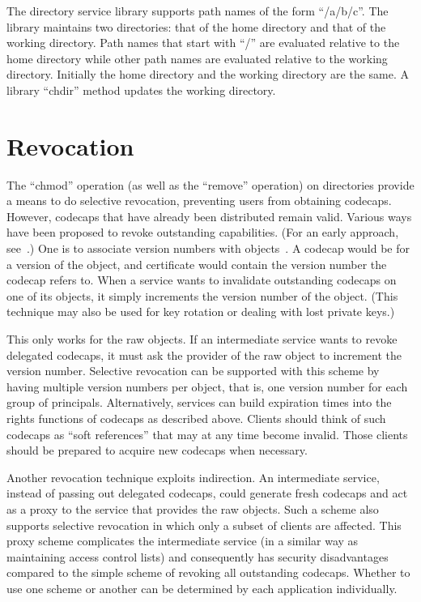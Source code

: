 \documentclass[10pt, conference, compsocconf]{IEEEtran}
\begin{document}
The directory service library supports path names of the form
``/a/b/c''.  The library maintains two directories: that of the
home directory and that of the working directory.  Path names that
start with ``/'' are evaluated relative to the home directory while
other path names are evaluated relative to the working directory.
Initially the home directory and the working directory are the same.
A library ``chdir'' method updates the working directory.



\section{Revocation}

The ``chmod'' operation (as well as the ``remove'' operation) on
directories provide a means to do selective revocation, preventing users
from obtaining codecaps.  However, codecaps
that have already been distributed remain valid.
Various ways have been proposed to revoke outstanding capabilities.
(For an early approach, see~\cite{Red74}.)
One is to associate version numbers with objects~\cite{GGT97}.
A codecap would be for a version of the object,
and certificate  would contain the version number the codecap refers
to.
When a service wants to invalidate outstanding codecaps on one of
its objects, it simply increments the version number of the object.
(This technique may also be used for key rotation or dealing with
lost private keys.)

This only works for the raw objects.  If an intermediate service
wants to revoke delegated codecaps, it must ask the provider of
the raw object to increment the version number.  Selective revocation
can be supported with this scheme by having multiple version numbers
per object, that is, one version number for each group of principals.
Alternatively, services can build expiration times into the
rights functions of codecaps as described above.  Clients should
think of such codecaps as ``soft references'' that may at any time
become invalid.
Those clients should be prepared to acquire new codecaps when
necessary.

Another revocation technique exploits indirection.  An intermediate service,
instead of passing out delegated codecaps, could generate fresh codecaps
and act as a proxy to the service that provides the raw objects.
Such a scheme also supports selective revocation
in which only a subset of clients are affected.  
This proxy scheme complicates the intermediate service (in a similar
way as maintaining access control lists) and consequently
has security disadvantages compared to the simple scheme of revoking
all outstanding codecaps.  Whether to use one scheme or another can be
determined by each application individually.
\end{document}
